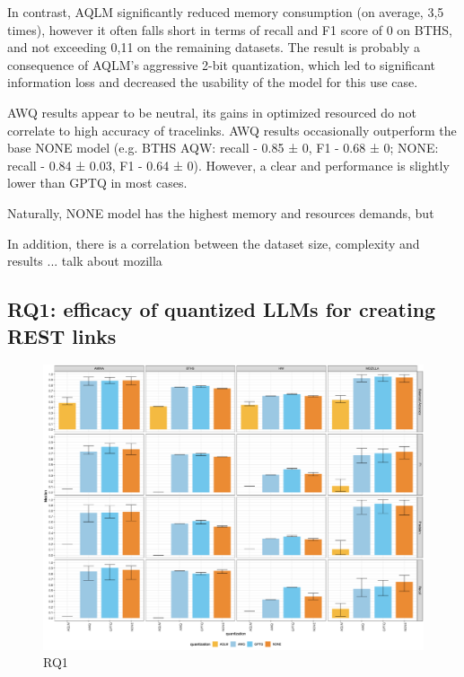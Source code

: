 \documentclass[conference]{IEEEtran}
\begin{document}
In contrast, AQLM significantly reduced memory consumption (on average, 3,5 times), however it often falls short in terms of recall and F1 score of 0 on BTHS, and not exceeding 0,11 on the remaining datasets. The result is probably a consequence of AQLM's aggressive 2-bit quantization, which led to significant information loss and decreased the usability of the model for this use case.

AWQ results appear to be neutral, its gains in optimized resourced do not correlate to high accuracy of tracelinks. AWQ results occasionally outperform the base NONE model (e.g. BTHS AQW: recall - 0.85 ± 0, F1 - 0.68 ± 0; NONE: recall - 0.84 ± 0.03, F1 - 0.64 ± 0). However, a clear  and performance is slightly lower than GPTQ in most cases.


Naturally, NONE model has the highest memory and resources demands, but

 In addition, there is a correlation between the dataset size, complexity and results ...
talk about mozilla 


 

\subsection{\textbf{RQ1:} efficacy of quantized LLMs for creating REST links}

\begin{figure}[H]
    \centering
    \includegraphics[width=0.99\columnwidth]{images/RQ1_quant_comparison.png}
    \caption{RQ1}
    \label{fig:rq1}
\end{figure}
\end{document}
